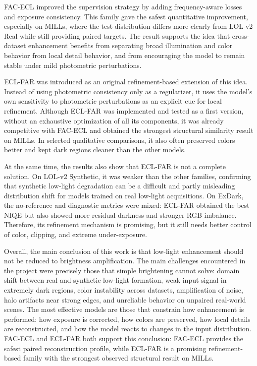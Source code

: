 FAC-ECL improved the supervision strategy by adding frequency-aware losses and exposure consistency. This family gave the safest quantitative improvement, especially on MILLs, where the test distribution differs more clearly from LOL-v2 Real while still providing paired targets. The result supports the idea that cross-dataset enhancement benefits from separating broad illumination and color behavior from local detail behavior, and from encouraging the model to remain stable under mild photometric perturbations.

ECL-FAR was introduced as an original refinement-based extension of this idea. Instead of using photometric consistency only as a regularizer, it uses the model's own sensitivity to photometric perturbations as an explicit cue for local refinement. Although ECL-FAR was implemented and tested as a first version, without an exhaustive optimization of all its components, it was already competitive with FAC-ECL and obtained the strongest structural similarity result on MILLs. In selected qualitative comparisons, it also often preserved colors better and kept dark regions cleaner than the other models.

At the same time, the results also show that ECL-FAR is not a complete solution. On LOL-v2 Synthetic, it was weaker than the other families, confirming that synthetic low-light degradation can be a difficult and partly misleading distribution shift for models trained on real low-light acquisitions. On ExDark, the no-reference and diagnostic metrics were mixed: ECL-FAR obtained the best NIQE but also showed more residual darkness and stronger RGB imbalance. Therefore, its refinement mechanism is promising, but it still needs better control of color, clipping, and extreme under-exposure.

Overall, the main conclusion of this work is that low-light enhancement should not be reduced to brightness amplification. The main challenges encountered in the project were precisely those that simple brightening cannot solve: domain shift between real and synthetic low-light formation, weak input signal in extremely dark regions, color instability across datasets, amplification of noise, halo artifacts near strong edges, and unreliable behavior on unpaired real-world scenes. The most effective models are those that constrain how enhancement is performed: how exposure is corrected, how colors are preserved, how local details are reconstructed, and how the model reacts to changes in the input distribution. FAC-ECL and ECL-FAR both support this conclusion: FAC-ECL provides the safest paired reconstruction profile, while ECL-FAR is a promising refinement-based family with the strongest observed structural result on MILLs.

